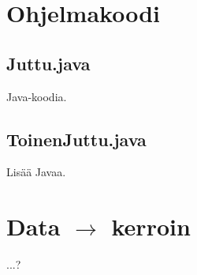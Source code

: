 \documentclass[12pt]{scrreprt}
\begin{document}
  \begin{appendices}

  \chapter{Ohjelmakoodi}
  
  \section{Juttu.java}
  
  Java-koodia.
  
  \section{ToinenJuttu.java}

  Lisää Javaa.

  \chapter{Data $\rightarrow$ kerroin}
   
  ...?

  \end{appendices}
\end{document}
